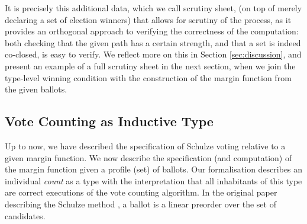 \noindent
It is precisely this additional data, which we call scrutiny sheet,
(on top of merely declaring a set of
election winners) that allows for scrutiny of the process, as it
provides an orthogonal approach to verifying the correctness of the
computation: both checking that the given path has a certain
strength, and that a set is indeed co-closed, is easy to verify.
We reflect more on this in Section
\ref{sec:discussion}, and present an example of a full scrutiny
sheet in the next section, when we join the type-level winning
condition with the construction of the margin function from the
given ballots. 

\subsection{Vote Counting as Inductive Type}
\label{sec:inductive_type}
Up to now, we have described the specification of Schulze voting
relative to a given margin function. We now describe the
specification (and computation) of the margin function given a
profile (set) of ballots.  Our formalisation describes an individual
\emph{count} as a type with the interpretation that all inhabitants
of this type are correct executions of the vote counting algorithm.
In the original paper describing the
Schulze method \citep{Schulze:2011:NMC}, a ballot is a linear
preorder over the set of candidates.

